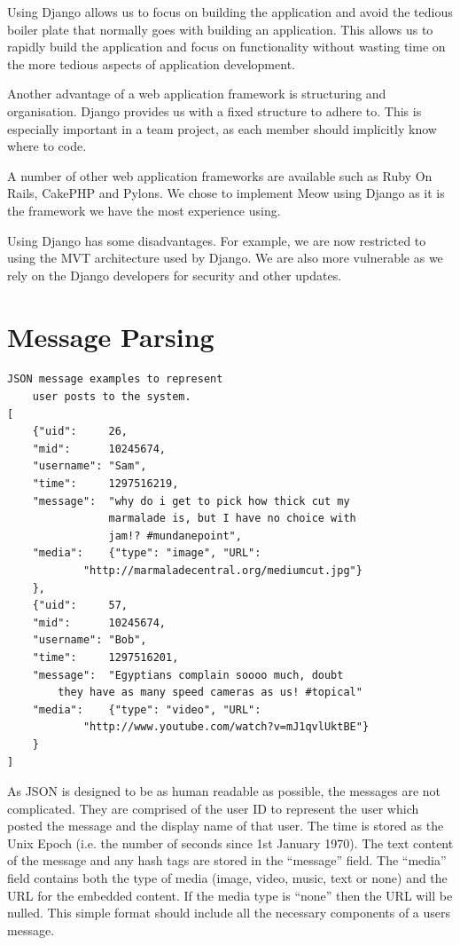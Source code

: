 \documentclass{sig-alt-release2}
\begin{document}
Using Django allows us to focus on building the application and avoid the tedious boiler plate that normally goes with building an application. This allows us to rapidly build the application and focus on functionality without wasting time on the more tedious aspects of application development.

Another advantage of a web application framework is structuring and organisation. Django provides us with a fixed structure to adhere to. This is especially important in a team project, as each member should implicitly know where to code.

A number of other web application frameworks are available such as Ruby On Rails, CakePHP and Pylons. We chose to implement Meow using Django as it is the framework we have the most experience using.

Using Django has some disadvantages.  For example, we are now restricted to using the MVT architecture used by Django. We are also more vulnerable as we rely on the Django developers for security and other updates. 

\section{Message Parsing}

\begin{verbatim}
JSON message examples to represent 
	user posts to the system.
[
	{"uid":  	26,
	"mid":  	10245674,
    "username": "Sam",
    "time": 	1297516219,
    "message":  "why do i get to pick how thick cut my 
				marmalade is, but I have no choice with
				jam!? #mundanepoint",
	"media":	{"type": "image", "URL":
			"http://marmaladecentral.org/mediumcut.jpg"}
	},
	{"uid":  	57,
	"mid":  	10245674,
    "username": "Bob",
    "time": 	1297516201,
    "message":  "Egyptians complain soooo much, doubt
		they have as many speed cameras as us! #topical"
	"media":	{"type": "video", "URL":
			"http://www.youtube.com/watch?v=mJ1qvlUktBE"}
	}
]  
\end{verbatim}

As JSON is designed to be as human readable as possible, the messages are not complicated. They are comprised of the user ID to represent the user which posted the message and the display name of that user. The time is stored as the Unix Epoch (i.e. the number of seconds since 1st January 1970). The text content of the message and any hash tags are stored in the ``message'' field. The ``media'' field contains both the type of media (image, video, music, text or none) and the URL for the embedded content. If the media type is ``none'' then the URL will be nulled. This simple format should include all the necessary components of a users message.
\end{document}
